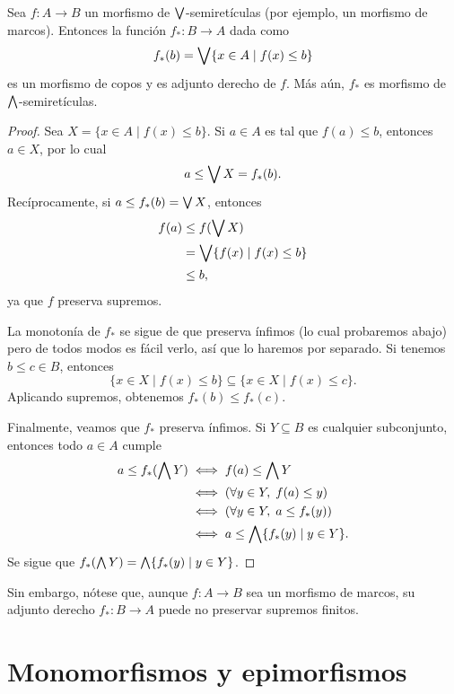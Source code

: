 \begin{lemma}
    Sea $f:A\to B$ un morfismo de $\bigvee$-semiretículas
    (por ejemplo, un morfismo de marcos).
    Entonces la función $f_*:B\to A$ dada como
    \[
        f_*(b) = \bigvee\{x\in A \mid f(x)\leq b\} 
    \]
    es un morfismo de copos y es adjunto derecho de $f$.
    Más aún, $f_*$ es morfismo de $\bigwedge$-semiretículas.
\end{lemma}
\begin{proof}
    Sea $X=\{x\in A\mid f(x)\leq b\}$.
    Si $a\in A$ es tal que $f(a)\leq b$, entonces $a\in X$,
    por lo cual
    \[
        a\leq \bigvee X= f_*(b)
    .\]
    Recíprocamente, si $a\leq f_*(b)=\bigvee X$, entonces
    \begin{align*}
        f(a)
        &\leq f(\bigvee X) \\
        &= \bigvee\{f(x)\mid f(x)\leq b\} \\
        &\leq b,
    \end{align*}
    ya que $f$ preserva supremos.

    La monotonía de $f_*$ se sigue de que preserva ínfimos (lo
    cual probaremos abajo) pero de todos modos es fácil verlo,
    así que lo haremos por separado.
    Si tenemos $b\leq c\in B$, entonces
    \[
        \{x\in X\mid f(x)\leq b\} \subseteq
        \{x\in X\mid f(x)\leq c\}.
    \]
    Aplicando supremos, obtenemos $f_*(b)\leq f_*(c)$.
    
    Finalmente, veamos que $f_*$ preserva ínfimos.
    Si $Y\subseteq B$ es cualquier subconjunto,
    entonces todo $a\in A$ cumple
    \begin{align*}
        a\leq f_*(\bigwedge Y)
        &\iff f(a)\leq \bigwedge Y \\
        &\iff (\forall y\in Y,\; f(a)\leq y) \\
        &\iff (\forall y\in Y,\; a\leq f_*(y)) \\
        &\iff a\leq \bigwedge\{f_*(y) \mid y\in Y\}.
    \end{align*}
    Se sigue que $f_*(\bigwedge Y)=\bigwedge\{f_*(y)\mid y\in Y\}$.
\end{proof}

Sin embargo, nótese que, aunque $f:A\to B$ sea un morfismo
de marcos, su adjunto derecho $f_*:B\to A$
puede no preservar supremos finitos.

\section{Monomorfismos y epimorfismos}

